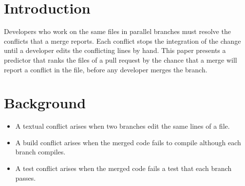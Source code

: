 \section{Introduction}
Developers who work on the same files in parallel branches must resolve the conflicts that a merge reports. Each
conflict stops the integration of the change until a developer edits the conflicting lines by hand. This paper
presents a predictor that ranks the files of a pull request by the chance that a merge will report a conflict in
the file, before any developer merges the branch.
\lipsum[1-8]

\section{Background}
{\sizeofsections\lipsum[9-14]\par}
\begin{itemize}
\item A textual conflict arises when two branches edit the same lines of a file.
\item A build conflict arises when the merged code fails to compile although each branch compiles.
\item A test conflict arises when the merged code fails a test that each branch passes.
\end{itemize}
\lipsum[15-18]

